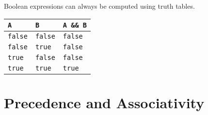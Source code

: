 \documentclass[jou]{apa6}
\begin{document}
Boolean expressions can always be computed using truth tables. 

\begin{tabular}{|l|l|l|} \hline
{\tt A} & {\tt B} & {\tt A \&\& B} \\ \hline
{\tt false} & {\tt false} & {\tt false} \\ \hline
{\tt false} & {\tt true} & {\tt false} \\ \hline
{\tt true} & {\tt false} & {\tt false} \\ \hline
{\tt true} & {\tt true} & {\tt true} \\ \hline
\end{tabular} 






\section{Precedence and Associativity}
\end{document}
